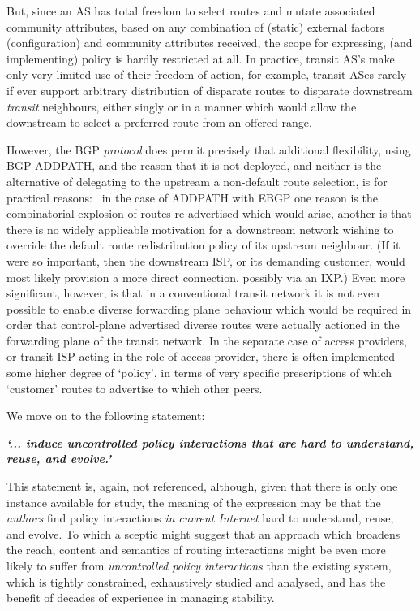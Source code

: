 But, since an AS has total freedom to select routes and mutate associated
community attributes, based on any combination of
(static) external factors (configuration) and community attributes received,
the scope for expressing, (and implementing) policy is hardly restricted at
all.
In practice, transit AS's make only very limited use of their freedom of
action, for example, transit ASes rarely if ever support arbitrary distribution
of disparate routes to disparate downstream \emph{transit} neighbours, either
singly or in a manner which would allow the downstream to select a preferred
route from an offered range.

However, the BGP \textit{protocol} does permit precisely that additional flexibility, using BGP ADDPATH, and the reason that it is not deployed, and neither is the alternative of delegating to the upstream a
non-default route selection, is for practical reasons: ~in the case of ADDPATH
with EBGP one reason is the combinatorial explosion of routes re-advertised which would arise, another
is that there is no widely applicable motivation for a downstream network wishing to
override the default route redistribution policy of its upstream neighbour. (If it were so important,
then the downstream ISP, or its demanding customer, would most likely provision a more
direct connection, possibly via an IXP.)
Even more significant, however, is that in a conventional transit network it is not even possible to enable diverse forwarding plane behaviour which would be required in order that control-plane advertised diverse routes were actually actioned in the forwarding plane of the transit network.
In the separate case of access providers, or transit ISP acting in the role of access provider, there is often
implemented some higher degree of `policy', in terms of very specific
prescriptions of which `customer' routes to advertise to which other peers.
\medskip

We move on to the following statement:

\textbf{\textit{`... induce uncontrolled policy interactions that are hard to understand, reuse, and evolve.'}}

This statement is, again, not referenced,
although, given that there is only one instance available for study, the
meaning of the expression may be that the \textit{authors} find policy
interactions \textit{in current Internet} hard to understand, reuse, and
evolve. To which a sceptic might suggest that an approach which broadens the
reach, content and semantics of routing interactions might be even more likely
to suffer from \textit{uncontrolled policy interactions} than the existing
system, which is tightly constrained, exhaustively studied and analysed, and
has the benefit of decades of experience in managing stability.

